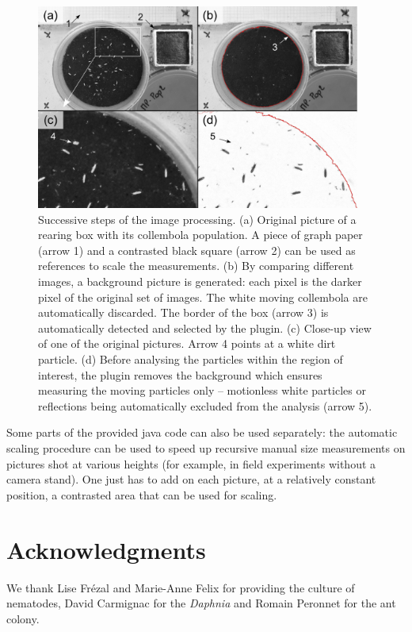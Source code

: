 \begin{figure}[!h] %
\centering
\includegraphics[width=0.95\textwidth]{2_Methodo/Fig/FigS3.pdf} 
\caption[Successive steps of the image processing]{
Successive steps of the image processing. (a) Original picture of a rearing box
with its collembola population. A piece of graph paper (arrow 1) and a
contrasted black square (arrow 2) can be used as references to scale the
measurements. (b) By comparing different images, a background picture is
generated: each pixel is the darker pixel of the original set of images. The
white moving collembola are automatically discarded. The border of the box
(arrow 3) is automatically detected and selected by the plugin. (c) Close-up
view of one of the original pictures. Arrow 4 points at a white dirt particle.
(d) Before analysing the particles within the region of interest, the plugin
removes the background which ensures measuring the moving particles only –
motionless white particles or reflections being automatically excluded from the
analysis (arrow 5).}
\label{Fig21-S3}
\end{figure}


Some parts of the provided java code can also be used separately: the automatic
scaling procedure can be used to speed up recursive manual size measurements on
pictures shot at various heights (for example, in field experiments without a
camera stand). One just has to add on each picture, at a relatively constant
position, a contrasted area that can be used for scaling.




\section{Acknowledgments}
We thank Lise Frézal and Marie-Anne Felix for providing the culture of
nematodes, David Carmignac for the \textit{Daphnia} and Romain Peronnet for the ant
colony.